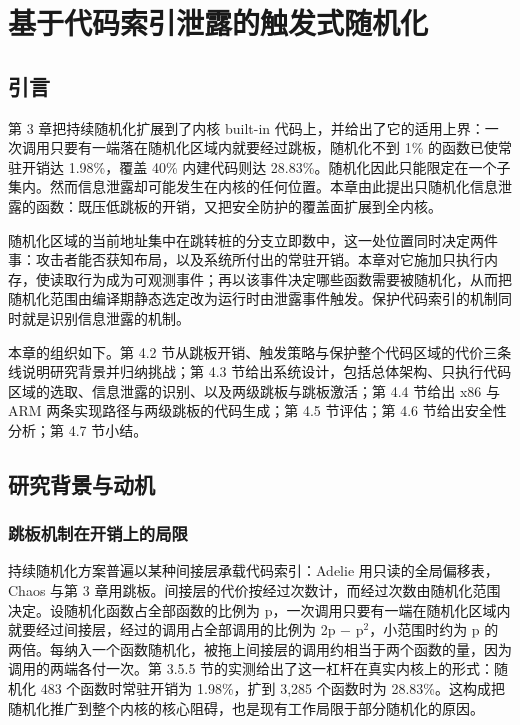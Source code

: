 \chapter{基于代码索引泄露的触发式随机化}
\label{chap:4}

\section{引言}

第 3 章把持续随机化扩展到了内核 built-in 代码上，并给出了它的适用上界：一次调用只要有一端落在随机化区域内就要经过跳板，随机化不到 1\% 的函数已使常驻开销达 1.98\%，覆盖 40\% 内建代码则达 28.83\%。随机化因此只能限定在一个子集内。然而信息泄露却可能发生在内核的任何位置。本章由此提出只随机化信息泄露的函数：既压低跳板的开销，又把安全防护的覆盖面扩展到全内核。

随机化区域的当前地址集中在跳转桩的分支立即数中，这一处位置同时决定两件事：攻击者能否获知布局，以及系统所付出的常驻开销。本章对它施加只执行内存，使读取行为成为可观测事件；再以该事件决定哪些函数需要被随机化，从而把随机化范围由编译期静态选定改为运行时由泄露事件触发。保护代码索引的机制同时就是识别信息泄露的机制。

本章的组织如下。第 4.2 节从跳板开销、触发策略与保护整个代码区域的代价三条线说明研究背景并归纳挑战；第 4.3 节给出系统设计，包括总体架构、只执行代码区域的选取、信息泄露的识别、以及两级跳板与跳板激活；第 4.4 节给出 x86 与 ARM 两条实现路径与两级跳板的代码生成；第 4.5 节评估；第 4.6 节给出安全性分析；第 4.7 节小结。

\section{研究背景与动机}

\subsection{跳板机制在开销上的局限}

持续随机化方案普遍以某种间接层承载代码索引：Adelie\citep{nikolaev2022adelie} 用只读的全局偏移表，Chaos\citep{chang2024chaos} 与第 3 章用跳板。间接层的代价按经过次数计，而经过次数由随机化范围决定。设随机化函数占全部函数的比例为 p，一次调用只要有一端在随机化区域内就要经过间接层，经过的调用占全部调用的比例为 2p − p$^{2}$，小范围时约为 p 的两倍。每纳入一个函数随机化，被拖上间接层的调用约相当于两个函数的量，因为调用的两端各付一次。第 3.5.5 节的实测给出了这一杠杆在真实内核上的形式：随机化 483 个函数时常驻开销为 1.98\%，扩到 3,285 个函数时为 28.83\%。这构成把随机化推广到整个内核的核心阻碍，也是现有工作局限于部分随机化的原因。

